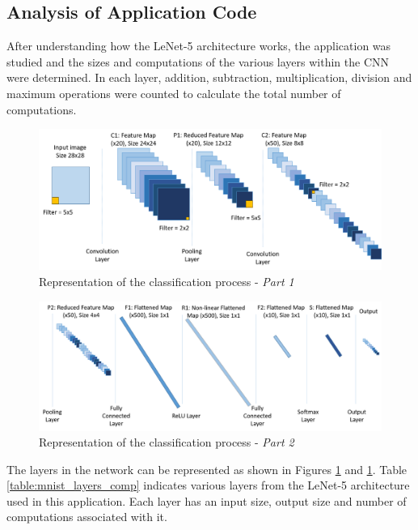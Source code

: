 \subsection{Analysis of Application Code}
\label{sect5_3_1}
After understanding how the LeNet-5 architecture works, the application was studied and the sizes and computations of the various layers within the CNN were determined. In each layer, addition, subtraction, multiplication, division and maximum operations were counted to calculate the total number of computations.
\begin{figure}[h!]
\centering
\includegraphics[width=13cm]{figures/Papaa_LeNet5-1.png}
\caption{Representation of the classification process - \textit{Part 1}}
\label{fig:cnn14}
\end{figure}

\begin{figure}[h!]
\centering
\includegraphics[width=\linewidth]{figures/Papaa_LeNet5-2.png}
\caption{Representation of the classification process - \textit{Part 2}}
\label{fig:cnn15}
\end{figure}

The layers in the network can be represented as shown in Figures \ref{fig:cnn14} and \ref{fig:cnn14}. Table \ref{table:mnist_layers_comp} indicates various layers from the LeNet-5 architecture used in this application. Each layer has an input size, output size and number of computations associated with it.

